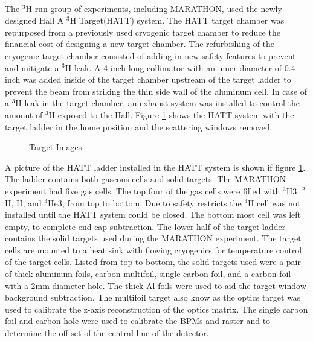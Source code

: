\paragraph{} The $^3$H run group of experiments, including MARATHON, used the newly designed Hall A $^3$H Target(HATT) system. The HATT target chamber was repurposed from a previously used cryogenic target chamber to reduce the financial cost of designing a new target chamber. The refurbishing of the cryogenic target chamber consisted of adding in new safety features to prevent and mitigate a $^3$H leak.  A 4 inch long collimator with an inner diameter of 0.4 inch was added inside of the target chamber upstream of the target ladder to prevent the beam from striking the thin side wall of the aluminum cell. In case of a $^3$H leak in the target chamber, an exhaust system was installed to control the amount of $^3$H exposed to the Hall.\cite{HATT_eng}  Figure \ref{HATT} shows the HATT system with the target ladder in the home position and the scattering windows removed. 
\begin{figure}[t]
	\centering
	
	\hspace*{-20pt}
	\centering
	\caption{Target Images}
	\label{HATT}


\end{figure}
A picture of the HATT ladder installed in the HATT system is shown if figure \ref{HATT}. The ladder contains both gaseous cells and solid targets. The MARATHON experiment had five gas cells. The top four of the gas cells were filled with $^3$H3, $^2$H, H, and $^3$He3, from top to bottom. Due to safety restricts the $^3$H cell was not installed until the HATT system could be closed. The bottom most cell was left empty, to complete end cap subtraction. The lower half of the target ladder contains the solid targets used during the MARATHON experiment. The target cells are mounted to a heat sink with flowing cryogenics for temperature control of the target cells. Listed from top to bottom, the solid targets used were a pair of thick aluminum foils, carbon multifoil, single carbon foil, and a carbon foil with a 2mm diameter hole. The thick Al foils were used to aid the target window background subtraction. The multifoil target also know as the optics target was used to calibrate the z-axis  reconstruction of the optics matrix. The single carbon foil and carbon hole were used to calibrate the BPMs and raster and to determine the off set of the central line of the detector. 

